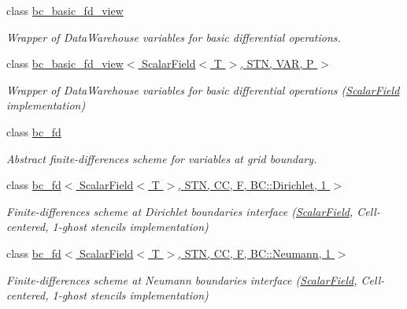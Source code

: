 \begin{DoxyCompactItemize}
class \hyperlink{classUintah_1_1PhaseField_1_1detail_1_1bc__basic__fd__view}{bc\+\_\+basic\+\_\+fd\+\_\+view}
\begin{DoxyCompactList}\small\item\em Wrapper of Data\+Warehouse variables for basic differential operations. \end{DoxyCompactList}\item 
class \hyperlink{classUintah_1_1PhaseField_1_1detail_1_1bc__basic__fd__view_3_01ScalarField_3_01T_01_4_00_01STN_00_01VAR_00_01P_01_4}{bc\+\_\+basic\+\_\+fd\+\_\+view$<$ Scalar\+Field$<$ T $>$, S\+T\+N, V\+A\+R, P $>$}
\begin{DoxyCompactList}\small\item\em Wrapper of Data\+Warehouse variables for basic differential operations (\hyperlink{structUintah_1_1PhaseField_1_1ScalarField}{Scalar\+Field} implementation) \end{DoxyCompactList}\item 
class \hyperlink{classUintah_1_1PhaseField_1_1detail_1_1bc__fd}{bc\+\_\+fd}
\begin{DoxyCompactList}\small\item\em Abstract finite-\/differences scheme for variables at grid boundary. \end{DoxyCompactList}\item 
class \hyperlink{classUintah_1_1PhaseField_1_1detail_1_1bc__fd_3_01ScalarField_3_01T_01_4_00_01STN_00_01CC_00_01Fa77b2fd7fb77d0a4dc6c86c68d4ea0bc}{bc\+\_\+fd$<$ Scalar\+Field$<$ T $>$, S\+T\+N, C\+C, F, B\+C\+::\+Dirichlet, 1 $>$}
\begin{DoxyCompactList}\small\item\em Finite-\/differences scheme at Dirichlet boundaries interface (\hyperlink{structUintah_1_1PhaseField_1_1ScalarField}{Scalar\+Field}, Cell-\/centered, 1-\/ghost stencils implementation) \end{DoxyCompactList}\item 
class \hyperlink{classUintah_1_1PhaseField_1_1detail_1_1bc__fd_3_01ScalarField_3_01T_01_4_00_01STN_00_01CC_00_01F_00_01BC_1_1Neumann_00_011_01_4}{bc\+\_\+fd$<$ Scalar\+Field$<$ T $>$, S\+T\+N, C\+C, F, B\+C\+::\+Neumann, 1 $>$}
\begin{DoxyCompactList}\small\item\em Finite-\/differences scheme at Neumann boundaries interface (\hyperlink{structUintah_1_1PhaseField_1_1ScalarField}{Scalar\+Field}, Cell-\/centered, 1-\/ghost stencils implementation) \end{DoxyCompactList}\item 

\end{DoxyCompactItemize}
